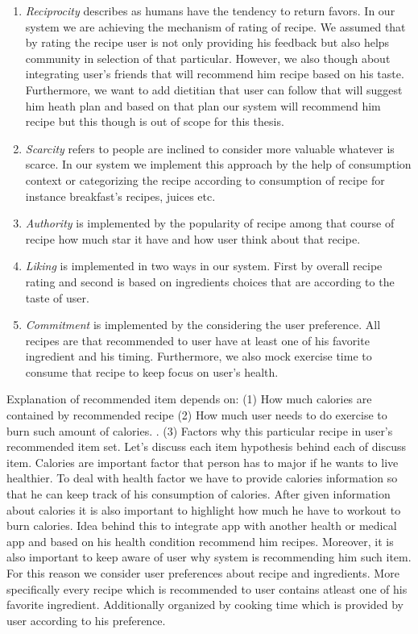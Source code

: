 \begin{enumerate}
	\item \textit{Reciprocity} describes as humans have the tendency to return favors. In our system we are achieving the mechanism of rating of recipe. We assumed that by rating the recipe user is not only providing his feedback but also helps community in selection of that particular. However, we also though about integrating user’s friends that will recommend him recipe based on his taste. Furthermore, we want to add dietitian that user can follow that will suggest him heath plan and based on that plan our system will recommend him recipe but this though is out of scope for this thesis.

	\item \textit{Scarcity} refers to people are inclined to consider more valuable whatever is scarce. In our system we implement this approach by the help of consumption context or categorizing the recipe according to consumption of recipe for instance breakfast’s recipes, juices etc. 
	
	\item \textit{Authority}  is implemented by the popularity of recipe among that course of recipe how much star it have and how user think about that  recipe.
	
	\item \textit{Liking} is implemented in two ways in our system. First by overall recipe rating and second is based on ingredients choices that are according to the taste of user.

	\item \textit{Commitment} is implemented by the considering the user preference. All recipes are that recommended to user have at least one of his favorite ingredient and his timing. Furthermore, we also mock exercise time to consume that recipe to keep focus on user’s health.
\end{enumerate}


Explanation of recommended item depends on: (1) How much calories are contained by recommended recipe (2) How much user needs to do exercise to burn such amount of calories. . (3) Factors why this particular recipe in user’s recommended item set. Let’s discuss each item hypothesis behind each of discuss item. Calories are important factor that person has to major if he wants to live healthier. To deal with health factor we have to provide calories information so that he can keep track of his consumption of calories. After given information about calories it is also important to highlight how much he have to workout to burn calories. Idea behind this to integrate app with another health or medical app and based on his health condition recommend him recipes. Moreover, it is also important to keep aware of user why system is recommending him such item. For this reason we consider user preferences about recipe and ingredients. More specifically every recipe which is recommended to user contains atleast one of his favorite ingredient. Additionally organized by cooking time which is provided by user according to his preference.